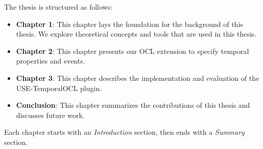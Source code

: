 The thesis is structured as follows:
\begin{itemize}
  \item \textbf{Chapter 1}: This chapter lays the foundation for the background of this thesis.
  We explore theoretical concepts and tools that are used in this thesis.
  
  \item \textbf{Chapter 2}: This chapter presents our OCL extension to specify temporal properties and events.

  \item \textbf{Chapter 3}: This chapter describes the implementation and evaluation of the USE-TemporalOCL plugin. 

  \item \textbf{Conclusion}: This chapter summarizes the contributions of this thesis and discusses future work.
\end{itemize}

Each chapter starts with an \textit{Introduction} section, then ends with a \textit{Summary} section.



